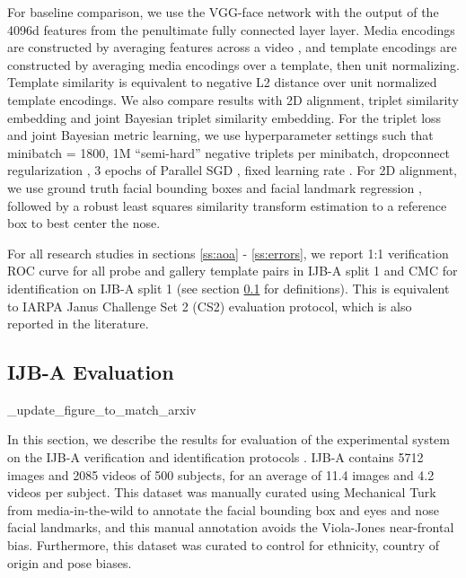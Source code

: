 \documentclass[10pt,twocolumn,letterpaper]{article}
\theoremstyle{definition}		\newtheorem{defn}[thm]{Definition}
\begin{document}
For baseline comparison, we use the VGG-face network with the output of the 4096d features from the penultimate fully connected layer layer.  Media encodings are constructed by averaging features across a video \cite{Parkhi14,Parkhi15}, and template encodings are constructed by averaging media encodings over a template, then unit normalizing.  Template similarity is equivalent to negative L2 distance over unit normalized template encodings.  We also compare results with 2D alignment, triplet similarity embedding and joint Bayesian triplet similarity embedding.  For the triplet loss and joint Bayesian metric learning, we use hyperparameter settings such that minibatch = 1800, 1M “semi-hard” \cite{Schroff15} negative triplets per minibatch, dropconnect regularization \cite{Wan13}, 3 epochs of Parallel SGD \cite{Zinkevich11}, fixed learning rate .  For 2D alignment, we use ground truth facial bounding boxes and facial landmark regression \cite{Kazemi14}, followed by a robust least squares similarity transform estimation to a reference box to best center the nose.  

For all research studies in sections \ref{ss:aoa} - \ref{ss:errors}, we report 1:1 verification ROC curve for all probe and gallery template pairs in IJB-A split 1 and CMC for identification on IJB-A split 1 (see section \ref{ss:ijba_evaluation} for definitions).   This is equivalent to IARPA Janus Challenge Set 2 (CS2) evaluation protocol, which is also reported in the literature.     


\subsection{IJB-A Evaluation}
\label{ss:ijba_evaluation}

\ifdefined\ECCV

\fixme_update_figure_to_match_arxiv
\fi




In this section, we describe the results for evaluation of the experimental system on the IJB-A verification and identification protocols \cite{Klare15}. IJB-A contains 5712 images and 2085 videos of 500 subjects, for an average of 11.4 images and 4.2 videos per subject.  This dataset was manually curated using Mechanical Turk from media-in-the-wild to annotate the facial bounding box and eyes and nose facial landmarks, and this manual annotation avoids the Viola-Jones near-frontal bias. Furthermore, this dataset was curated to control for ethnicity, country of origin and pose biases.
\end{document}
